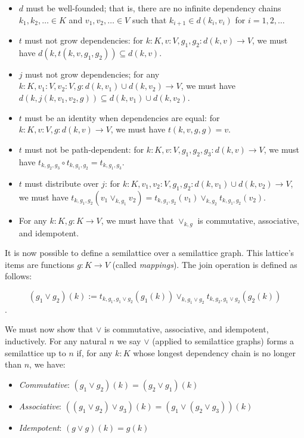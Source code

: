 \documentclass{article}
\begin{document}
        \begin{itemize}
            \item $d$ must be well-founded; that is, there are no infinite dependency chains $k_1, k_2, \ldots \in K$ and $v_1, v_2, \ldots \in V$ such that $k_{i+1} \in d(k_i, v_i)$ for $i = 1, 2, \ldots$
            \item $t$ must not grow dependencies: for $k : K, v : V, g_1, g_2 : d(k, v) \rightarrow V$, we must have $d(k, t(k, v, g_1, g_2)) \subseteq d(k, v)$.
            \item $j$ must not grow dependencies; for any $k : K, v_1 : V, v_2: V, g: d(k, v_1) \cup d(k, v_2) \rightarrow V$, we must have $d(k, j(k, v_1, v_2, g)) \subseteq d(k, v_1) \cup d(k, v_2)$.
            \item $t$ must be an identity when dependencies are equal: for $k : K, v : V, g : d(k, v) \rightarrow V$, we must have $t(k, v, g, g) = v$.
            \item $t$ must not be path-dependent: for $k : K, v : V, g_1, g_2, g_3: d(k, v) \rightarrow V$, we must have $t_{k, g_2, g_3} \circ t_{k, g_1, g_2} = t_{k, g_1, g_3}$.
            \item $t$ must distribute over $j$: for $k : K, v_1, v_2 : V, g_1, g_2 : d(k, v_1) \cup d(k, v_2) \rightarrow V$, we must have $t_{k, g_1, g_2}(v_1 \vee_{k, g_1} v_2) = t_{k, g_1, g_2}(v_1) \vee_{k, g_2} t_{k, g_1, g_2}(v_2)$.
            \item For any $k: K, g : K \rightarrow V$, we must have that $\vee_{k, g}$ is commutative, associative, and idempotent.
        \end{itemize}

        It is now possible to define a semilattice over a semilattice graph. This lattice's items are functions $g : K \rightarrow V$ (called \emph{mappings}). The join operation is defined as follows:

        $$ (g_1 \vee g_2)(k) := t_{k, g_1, g_1 \vee g_2}(g_1(k)) \vee_{k, g_1 \vee g_2} t_{k, g_2, g_1 \vee g_2}(g_2(k))$$.

        We must now show that $\vee$ is commutative, associative, and idempotent, inductively. For any natural $n$ we say $\vee$ (applied to semilattice graphs) forms a semilattice up to $n$ if, for any $k : K$ whose longest dependency chain is no longer than $n$, we have:

        \begin{itemize}
          \item \emph{Commutative}: $(g_1 \vee g_2)(k) = (g_2 \vee g_1)(k)$
          \item \emph{Associative}: $((g_1 \vee g_2) \vee g_3)(k) = (g_1 \vee (g_2 \vee g_3))(k)$
          \item \emph{Idempotent}: $(g \vee g)(k) = g(k)$
        \end{itemize}
\end{document}
